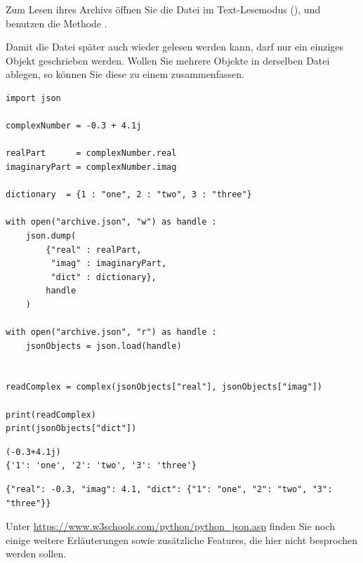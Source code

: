 Zum Lesen ihres Archivs öffnen Sie die Datei im Text-Lesemodus (), und benutzen die Methode .

Damit die Datei später auch wieder gelesen werden kann, darf nur ein einziges Objekt geschrieben werden. Wollen Sie mehrere Objekte in derselben Datei ablegen, so können Sie diese zu einem  zusammenfassen.

\begin{codebox}
\begin{verbatim}
import json

complexNumber = -0.3 + 4.1j

realPart      = complexNumber.real
imaginaryPart = complexNumber.imag

dictionary  = {1 : "one", 2 : "two", 3 : "three"}

with open("archive.json", "w") as handle :
    json.dump(
        {"real" : realPart,
         "imag" : imaginaryPart,
         "dict" : dictionary},
        handle
    )
    
with open("archive.json", "r") as handle :
    jsonObjects = json.load(handle)
    

readComplex = complex(jsonObjects["real"], jsonObjects["imag"])

print(readComplex)
print(jsonObjects["dict"])
\end{verbatim}
\end{codebox}

\begin{cmdbox}
\begin{verbatim}
(-0.3+4.1j)
{'1': 'one', '2': 'two', '3': 'three'}
\end{verbatim}
\end{cmdbox}

\begin{cmdbox}
\begin{verbatim}
{"real": -0.3, "imag": 4.1, "dict": {"1": "one", "2": "two", "3": "three"}}
\end{verbatim}
\end{cmdbox}

Unter \url{https://www.w3schools.com/python/python_json.asp} finden Sie noch einige weitere Erläuterungen sowie zusätzliche Features, die hier nicht besprochen werden sollen.

